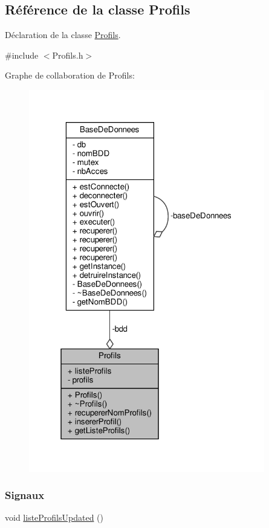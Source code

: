 \hypertarget{class_profils}{}\subsection{Référence de la classe Profils}
\label{class_profils}


Déclaration de la classe \hyperlink{class_profils}{Profils}.  




{\ttfamily \#include $<$Profils.\+h$>$}



Graphe de collaboration de Profils\+:\nopagebreak
\begin{figure}[H]
\begin{center}
\leavevmode
\includegraphics[width=292pt]{class_profils__coll__graph}
\end{center}
\end{figure}
\subsubsection*{Signaux}
\begin{DoxyCompactItemize}
\item 
void \hyperlink{class_profils_a8facf83b130f6583c9a29670faca948b}{liste\+Profils\+Updated} ()
\end{DoxyCompactItemize}
